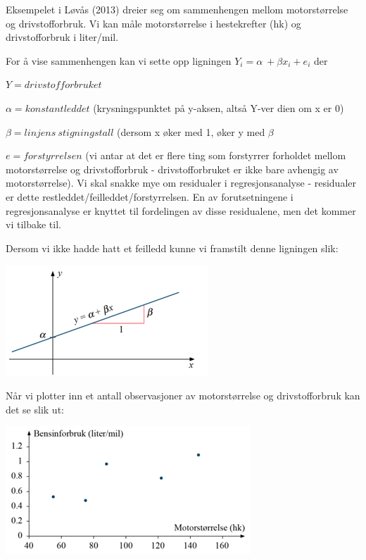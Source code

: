 \documentclass[
]{article}
\begin{document}
Eksempelet i Løvås (2013) dreier seg om sammenhengen mellom
motorstørrelse og drivstofforbruk. Vi kan måle motorstørrelse i
hestekrefter (hk) og drivstofforbruk i liter/mil.

For å vise sammenhengen kan vi sette opp ligningen
\(Y_i=\alpha\:+\beta x_i+e_i\) der

\(Y=drivstofforbruket\)

\(\alpha=konstantleddet\) (krysningspunktet på y-aksen, altså Y-ver dien
om x er 0)

\(\beta=linjens\:stigningstall\) (dersom x øker med 1, øker y med
\(\beta\)

\(e=forstyrrelsen\) (vi antar at det er flere ting som forstyrrer
forholdet mellom motorstørrelse og drivstofforbruk - drivstofforbruket
er ikke bare avhengig av motorstørrelse). Vi skal snakke mye om
residualer i regresjonsanalyse - residualer er dette
restleddet/feilleddet/forstyrrelsen. En av forutsetningene i
regresjonsanalyse er knyttet til fordelingen av disse residualene, men
det kommer vi tilbake til.

Dersom vi ikke hadde hatt et feilledd kunne vi framstilt denne ligningen
slik:

\includegraphics{Teori_fig1.png}

Når vi plotter inn et antall observasjoner av motorstørrelse og
drivstofforbruk kan det se slik ut:

\includegraphics{Teori_fig2.png}
\end{document}
